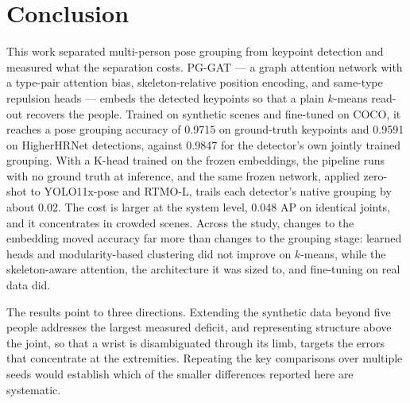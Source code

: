 \section{Conclusion}
\label{sec:conclusion}

This work separated multi-person pose grouping from keypoint detection and measured what the separation costs.
PG-GAT --- a graph attention network with a type-pair attention bias, skeleton-relative position encoding,
and same-type repulsion heads --- embeds the detected keypoints so that a plain $k$-means read-out recovers the people.
Trained on synthetic scenes and fine-tuned on COCO,
it reaches a pose grouping accuracy of 0.9715 on ground-truth keypoints and 0.9591 on HigherHRNet detections,
against 0.9847 for the detector's own jointly trained grouping.
With a K-head trained on the frozen embeddings, the pipeline runs with no ground truth at inference,
and the same frozen network, applied zero-shot to YOLO11x-pose and RTMO-L, trails each detector's native grouping by about 0.02.
The cost is larger at the system level, 0.048 AP on identical joints, and it concentrates in crowded scenes.
Across the study, changes to the embedding moved accuracy far more than changes to the grouping stage:
learned heads and modularity-based clustering did not improve on $k$-means, while the skeleton-aware attention,
the architecture it was sized to, and fine-tuning on real data did.

The results point to three directions.
Extending the synthetic data beyond five people addresses the largest measured deficit,
and representing structure above the joint, so that a wrist is disambiguated through its limb,
targets the errors that concentrate at the extremities.
Repeating the key comparisons over multiple seeds would establish
which of the smaller differences reported here are systematic.